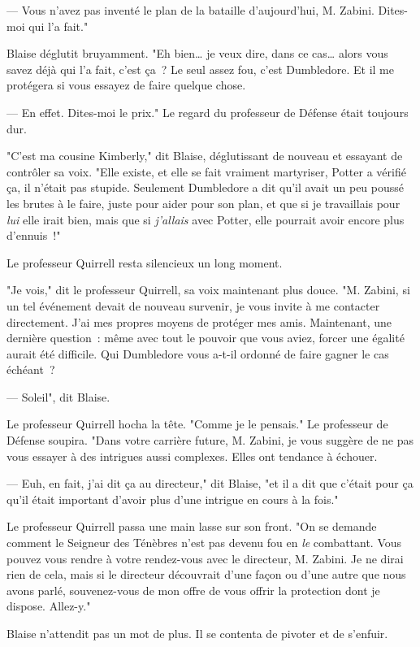 --- Vous n'avez pas inventé le plan de la bataille d'aujourd'hui, M. Zabini. Dites-moi qui l'a fait."

Blaise déglutit bruyamment. "Eh bien… je veux dire, dans ce cas… alors vous savez déjà qui l'a fait, c'est ça~? Le seul assez fou, c'est Dumbledore. Et il me protégera si vous essayez de faire quelque chose.

--- En effet. Dites-moi le prix." Le regard du professeur de Défense était toujours dur.

"C'est ma cousine Kimberly," dit Blaise, déglutissant de nouveau et essayant de contrôler sa voix. "Elle existe, et elle se fait vraiment martyriser, Potter a vérifié ça, il n'était pas stupide. Seulement Dumbledore a dit qu'il avait un peu poussé les brutes à le faire, juste pour aider pour son plan, et que si je travaillais pour \emph{lui} elle irait bien, mais que si \emph{j'allais} avec Potter, elle pourrait avoir encore plus d'ennuis~!"

Le professeur Quirrell resta silencieux un long moment.

"Je vois," dit le professeur Quirrell, sa voix maintenant plus douce. "M. Zabini, si un tel événement devait de nouveau survenir, je vous invite à me contacter directement. J'ai mes propres moyens de protéger mes amis. Maintenant, une dernière question~: même avec tout le pouvoir que vous aviez, forcer une égalité aurait été difficile. Qui Dumbledore vous a-t-il ordonné de faire gagner le cas échéant~?

--- Soleil", dit Blaise.

Le professeur Quirrell hocha la tête. "Comme je le pensais." Le professeur de Défense soupira. "Dans votre carrière future, M. Zabini, je vous suggère de ne pas vous essayer à des intrigues aussi complexes. Elles ont tendance à échouer.

--- Euh, en fait, j'ai dit ça au directeur," dit Blaise, "et il a dit que c'était pour ça qu'il était important d'avoir plus d'une intrigue en cours à la fois."

Le professeur Quirrell passa une main lasse sur son front. "On se demande comment le Seigneur des Ténèbres n'est pas devenu fou en \emph{le} combattant. Vous pouvez vous rendre à votre rendez-vous avec le directeur, M. Zabini. Je ne dirai rien de cela, mais si le directeur découvrait d'une façon ou d'une autre que nous avons parlé, souvenez-vous de mon offre de vous offrir la protection dont je dispose. Allez-y."

Blaise n'attendit pas un mot de plus. Il se contenta de pivoter et de s'enfuir.

